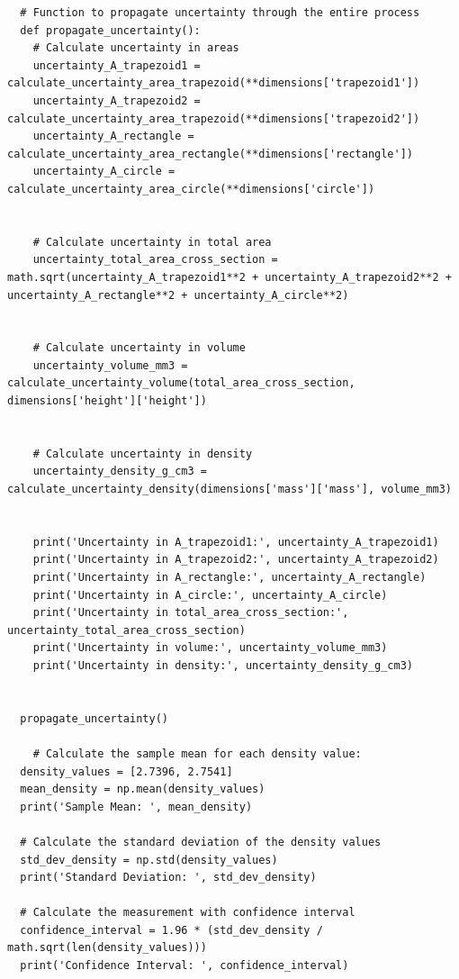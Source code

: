 \documentclass{article}
\begin{document}
\begin{appendices}
\begin{verbatim}
  # Function to propagate uncertainty through the entire process
  def propagate_uncertainty():
  	# Calculate uncertainty in areas
  	uncertainty_A_trapezoid1 = calculate_uncertainty_area_trapezoid(**dimensions['trapezoid1'])
  	uncertainty_A_trapezoid2 = calculate_uncertainty_area_trapezoid(**dimensions['trapezoid2'])
  	uncertainty_A_rectangle = calculate_uncertainty_area_rectangle(**dimensions['rectangle'])
  	uncertainty_A_circle = calculate_uncertainty_area_circle(**dimensions['circle'])


  	# Calculate uncertainty in total area
  	uncertainty_total_area_cross_section = math.sqrt(uncertainty_A_trapezoid1**2 + uncertainty_A_trapezoid2**2 + uncertainty_A_rectangle**2 + uncertainty_A_circle**2)


  	# Calculate uncertainty in volume
  	uncertainty_volume_mm3 = calculate_uncertainty_volume(total_area_cross_section, dimensions['height']['height'])


  	# Calculate uncertainty in density
  	uncertainty_density_g_cm3 = calculate_uncertainty_density(dimensions['mass']['mass'], volume_mm3)


  	print('Uncertainty in A_trapezoid1:', uncertainty_A_trapezoid1)
  	print('Uncertainty in A_trapezoid2:', uncertainty_A_trapezoid2)
  	print('Uncertainty in A_rectangle:', uncertainty_A_rectangle)
  	print('Uncertainty in A_circle:', uncertainty_A_circle)
  	print('Uncertainty in total_area_cross_section:', uncertainty_total_area_cross_section)
  	print('Uncertainty in volume:', uncertainty_volume_mm3)
  	print('Uncertainty in density:', uncertainty_density_g_cm3)


  propagate_uncertainty()

    # Calculate the sample mean for each density value:
  density_values = [2.7396, 2.7541]
  mean_density = np.mean(density_values)
  print('Sample Mean: ', mean_density)

  # Calculate the standard deviation of the density values
  std_dev_density = np.std(density_values)
  print('Standard Deviation: ', std_dev_density)

  # Calculate the measurement with confidence interval
  confidence_interval = 1.96 * (std_dev_density / math.sqrt(len(density_values)))
  print('Confidence Interval: ', confidence_interval)

\end{verbatim}


\end{appendices}
\end{document}
